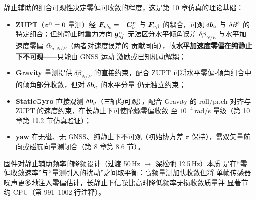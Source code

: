 静止辅助的组合可观性决定零偏可收敛的程度，这是第 10 章仿真的理论基础：
\begin{itemize}
  \item \textbf{ZUPT}（$\boldsymbol{v}^n = 0$ 量测）经 $\boldsymbol{F}_{v b_a} = -\boldsymbol{C}_b^n$ 与
    $\boldsymbol{F}_{v\beta}$ 的耦合，可观 $\delta\boldsymbol{b}_a$ 与 $\delta\boldsymbol{\beta}^b$ 的
    特定组合；但纯静止时重力方向 $\boldsymbol{g}_{sf}^n$ 无法区分水平倾角误差
    $\delta\beta_{N/E}$ 与水平加速度零偏 $\delta b_{a,N/E}$（两者对速度误差的
    贡献同向），故\textbf{水平加速度零偏在纯静止下不可观}——只能由 GNSS 运动
    激励或已知机动解耦；
  \item \textbf{Gravity} 量测提供 $\delta\beta_{N/E}$ 的直接约束，配合 ZUPT
    可将水平零偏-倾角组合中的倾角部分收敛，但对 $\delta\boldsymbol{b}_a$ 的水平分量
    仍无独立约束；
  \item \textbf{StaticGyro} 直接观测 $\delta\boldsymbol{b}_g$（三轴均可观），配合
    Gravity 的 roll/pitch 对齐与 ZUPT 的速度约束，在长静止下可使陀螺零偏收敛
    至 $10^{-4}$\,rad/s 量级（第 10 章第 10.2 节仿真验证）；
  \item \textbf{yaw} 在无磁、无 GNSS、纯静止下不可观（初始协方差
    $\pi$ 保持），需双矢量航向或磁航向量测闭合（第 8 章第 8.6 节）。
\end{itemize}

\begin{remark}
固件对静止辅助频率的降频设计（过渡 50\,Hz $\rightarrow$ 深松弛 12.5\,Hz）本质
是在``零偏收敛速率''与``量测引入的扰动''之间取平衡：高频量测加快收敛但将
单帧传感器噪声更多地注入零偏估计，长静止下信噪比高时降低频率无损收敛质量并
显著节约 CPU（第 991--1002 行注释）。
\end{remark}
